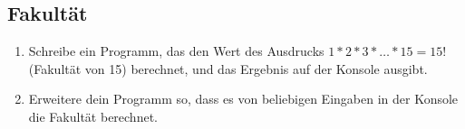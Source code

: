\subsection{Fakultät }
\begin{enumerate}
	\item Schreibe ein Programm, das den Wert des Ausdrucks $1 * 2 * 3 * \ldots * 15 = 15!$ (Fakultät von 15) berechnet, und das Ergebnis auf der Konsole ausgibt.
	\item Erweitere dein Programm so, dass es von beliebigen Eingaben in der Konsole die Fakultät berechnet.
\end{enumerate}
